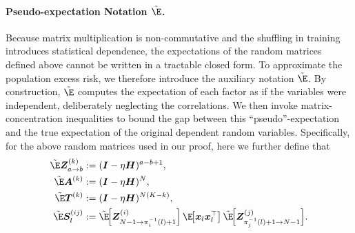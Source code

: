 \paragraph{Pseudo-expectation Notation $\fakeE$.} Because matrix multiplication is non-commutative and the shuffling in training introduces statistical dependence, the expectations of the random matrices defined above cannot be written in a tractable closed form. To approximate the population excess risk, we therefore introduce the auxiliary notation $\fakeE$.  By construction, $\fakeE$ computes the expectation of each factor as if the variables were independent, deliberately neglecting the correlations.  We then invoke matrix-concentration inequalities to bound the gap between this ``pseudo''-expectation and the true expectation of the original dependent random variables. Specifically, for the above random matrices used in our proof, here we further define that
\begin{align}
  \fakeE\mZ_{a \to b}^{(k)}
    &:= (\mI - \eta \mH)^{a-b+1},\\
  \fakeE\mA^{(k)}
    &:= (\mI - \eta \mH)^{N},\\
  \fakeE\mT^{(k)}
    &:= (\mI - \eta \mH)^{N(K-k)},\label{equ:faek-T}\\
  \fakeE\mS_l^{(ij)}
    &:= \fakeE\!\Bigl[\mZ_{N-1 \to \pi_i^{-1}(l)+1}^{(i)}\Bigr]\,
        \E\!\bigl[\vx_l\vx_l^{\top}\bigr]\,
        \fakeE\!\Bigl[\mZ_{\pi_j^{-1}(l)+1 \to N-1}^{(j)}\Bigr]. \label{equ:faek-S}
\end{align}



